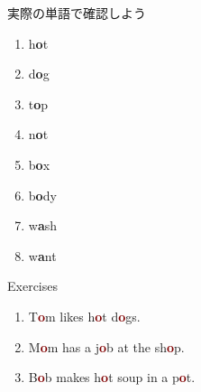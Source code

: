 \documentclass[aspectratio=169,xcolor={dvipsnames,table}]{beamer}
\begin{document}
\begin{frame}[plain]{実際の単語で確認しよう}
\LARGE

\hfill{\scriptsize {}}

\begin{enumerate}
 \item h\textcolor{NavyBlue}{\bfseries o}t%
\hfill{}\hspace{150pt}\mbox{}
 \item d\textcolor{NavyBlue}{\bfseries o}g%
\hfill{}\hspace{150pt}\mbox{} 
\item t\textcolor{NavyBlue}{\bfseries o}p%
\hfill{}\hspace{150pt}\mbox{}
 \item n\textcolor{NavyBlue}{\bfseries o}t%
\hfill{}\hspace{150pt}\mbox{} \item b\textcolor{NavyBlue}{\bfseries o}x%
\hfill{}\hspace{150pt}\mbox{}
 \item b\textcolor{NavyBlue}{\bfseries o}dy%
\hfill{}\hspace{150pt}\mbox{}
 \item w\textcolor{NavyBlue}{\bfseries a}sh%
\hfill{}\hspace{150pt}\mbox{}
 \item w\textcolor{NavyBlue}{\bfseries a}nt%
\hfill{}\hspace{150pt}\mbox{}

\end{enumerate}
\end{frame}
\begin{frame}[plain]{Exercises }
\LARGE

\begin{enumerate}
 \item T\textcolor{Maroon}{\bfseries o}m likes h\textcolor{Maroon}{\bfseries o}t d\textcolor{Maroon}{\bfseries o}gs.
 \item M\textcolor{Maroon}{\bfseries o}m has a j\textcolor{Maroon}{\bfseries o}b  at the sh\textcolor{Maroon}{\bfseries o}p.
 \item B\textcolor{Maroon}{\bfseries o}b makes h\textcolor{Maroon}{\bfseries o}t soup in a p\textcolor{Maroon}{\bfseries o}t.
\end{enumerate}

\hfill{\scriptsize {}}

\end{frame}
\end{document}
